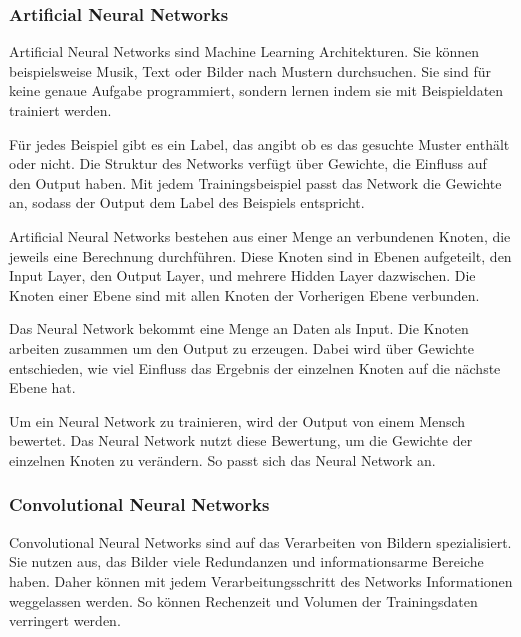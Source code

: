 
\subsubsection{Artificial Neural Networks}
Artificial Neural Networks sind Machine Learning Architekturen. Sie können beispielsweise Musik, Text oder Bilder nach Mustern durchsuchen. Sie sind für keine genaue Aufgabe programmiert, sondern lernen indem sie mit Beispieldaten trainiert werden. 

Für jedes Beispiel gibt es ein Label, das angibt ob es das gesuchte Muster enthält oder nicht. Die Struktur des Networks verfügt über Gewichte, die Einfluss auf den Output haben. Mit jedem Trainingsbeispiel passt das Network die Gewichte an, sodass der Output dem Label des Beispiels entspricht.\citep{introToCNN,surveyOfDeepLearing}

Artificial Neural Networks bestehen aus einer Menge an verbundenen Knoten, die jeweils eine Berechnung durchführen. Diese Knoten sind in Ebenen aufgeteilt, den Input Layer, den Output Layer, und mehrere Hidden Layer dazwischen. Die Knoten einer Ebene sind mit allen Knoten der Vorherigen Ebene verbunden.\citep{introToCNN,surveyOfDeepLearing}

Das Neural Network bekommt eine Menge an Daten als Input. Die Knoten arbeiten zusammen um den Output zu erzeugen. Dabei wird über Gewichte entschieden, wie viel Einfluss das Ergebnis der einzelnen Knoten auf die nächste Ebene hat.\citep{introToCNN,surveyOfDeepLearing}

Um ein Neural Network zu trainieren, wird der Output von einem Mensch bewertet. Das Neural Network nutzt diese Bewertung, um die Gewichte der einzelnen Knoten zu verändern. So passt sich das Neural Network an. \citep{introToCNN,surveyOfDeepLearing}

\subsubsection{Convolutional Neural Networks}
Convolutional Neural Networks sind auf das Verarbeiten von Bildern spezialisiert. Sie nutzen aus, das Bilder viele Redundanzen und informationsarme Bereiche haben. Daher können mit jedem Verarbeitungsschritt des Networks Informationen weggelassen werden. So können Rechenzeit und Volumen der Trainingsdaten verringert werden.\citep{introToCNN,surveyOfDeepLearing,cNNforClass}

